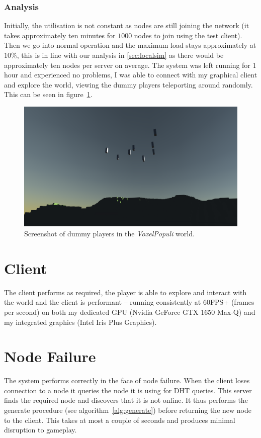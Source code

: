 \documentclass[12pt,notitlepage,a4paper]{report}
\newcommand{\voxpop}{\emph{VoxelPopuli}}
\begin{document}
	\subsubsection{Analysis}
	Initially, the utilisation is not constant as nodes are still joining the network (it takes approximately ten minutes for $1000$ nodes to join using the test client). Then we go into normal operation and the maximum load stays approximately at $10\%$, this is in line with our analysis in \cref{sec:localsim} as there would be approximately ten nodes per server on average. The system was left running for 1 hour and experienced no problems, I was able to connect with my graphical client and explore the world, viewing the dummy players teleporting around randomly. This can be seen in figure~\ref{fig:dummies}.
	\begin{figure}[!ht]
		\includegraphics[width=\textwidth]{dummies.png}
		\caption{Screenshot of dummy players in the \voxpop{} world.}
		\label{fig:dummies}
	\end{figure}

	\section{Client}
	The client performs as required, the player is able to explore and interact with the world and the client is performant -- running consistently at $60$FPS+ (frames per second) on both my dedicated GPU (Nvidia GeForce GTX $1650$ Max-Q) and my integrated graphics (Intel Iris Plus Graphics).

	\section{Node Failure}
	The system performs correctly in the face of node failure. When the client loses connection to a node it queries the node it is using for DHT queries. This server finds the required node and discovers that it is not online. It thus performs the generate procedure (see algorithm~\ref{alg:generate}) before returning the new node to the client. This takes at most a couple of seconds and produces minimal disruption to gameplay.
	
\end{document}
